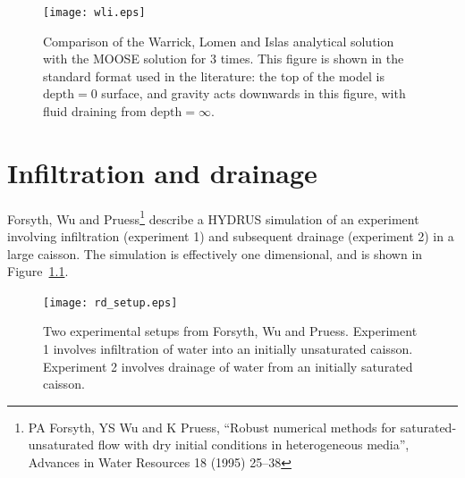 \documentclass[]{scrreprt}
\begin{document}
\begin{figure}[htb]
\centering
\texttt{[image: wli.eps]}
\caption{Comparison of the Warrick, Lomen and Islas analytical solution
  with the MOOSE solution for 3 times.  This figure is shown in the
  standard format used in the literature: the top of the model is
  $\mbox{depth}=0$ surface, and gravity acts downwards in this figure,
with fluid draining from $\mbox{depth}=\infty$.}
\label{wli.fig}
\end{figure}




\chapter{Infiltration and drainage}
\label{forsyth}

Forsyth, Wu and Pruess\footnote{PA Forsyth, YS Wu and K Pruess,
  ``Robust numerical methods for saturated-unsaturated flow with dry
  initial conditions in heterogeneous media'', Advances in Water
  Resources 18 (1995) 25--38} describe a HYDRUS simulation of an
experiment involving infiltration (experiment 1) and subsequent
drainage (experiment 2) in a large caisson.  The simulation is
effectively one dimensional, and is shown in
Figure~\ref{rd_setup.fig}.

\begin{figure}[htb]
\begin{center}
\texttt{[image: rd\_setup.eps]}
\caption{Two experimental setups from Forsyth, Wu and Pruess.
  Experiment 1 involves infiltration of water into an initially
  unsaturated caisson.  Experiment 2 involves drainage of water from
  an initially saturated caisson.}
\label{rd_setup.fig}
\end{center}
\end{figure}
\end{document}

